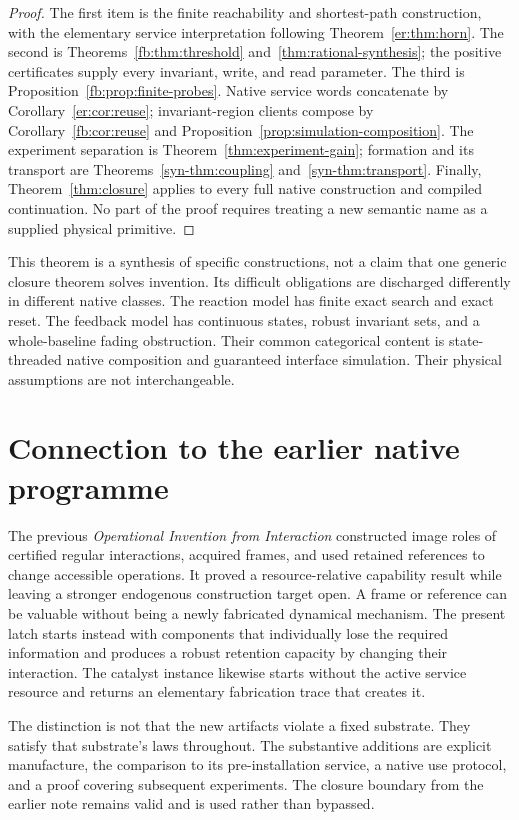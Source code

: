 \documentclass[11pt]{article}
\theoremstyle{definition}
\theoremstyle{remark}
\begin{document}
\begin{proof}
The first item is the finite reachability and shortest-path construction,
with the elementary service interpretation following
Theorem~\ref{er:thm:horn}. The second is
Theorems~\ref{fb:thm:threshold} and~\ref{thm:rational-synthesis}; the
positive certificates supply every invariant, write, and read parameter.
The third is Proposition~\ref{fb:prop:finite-probes}. Native service words
concatenate by Corollary~\ref{er:cor:reuse}; invariant-region clients
compose by Corollary~\ref{fb:cor:reuse} and
Proposition~\ref{prop:simulation-composition}. The experiment separation
is Theorem~\ref{thm:experiment-gain}; formation and its transport are
Theorems~\ref{syn-thm:coupling} and~\ref{syn-thm:transport}. Finally,
Theorem~\ref{thm:closure} applies to every full native construction and
compiled continuation. No part of the proof requires treating a new
semantic name as a supplied physical primitive.
\end{proof}

This theorem is a synthesis of specific constructions, not a claim that
one generic closure theorem solves invention. Its difficult obligations
are discharged differently in different native classes. The reaction
model has finite exact search and exact reset. The feedback model has
continuous states, robust invariant sets, and a whole-baseline fading
obstruction. Their common categorical content is state-threaded native
composition and guaranteed interface simulation. Their physical
assumptions are not interchangeable.

\section{Connection to the earlier native programme}\label{sec:project}
The previous \emph{Operational Invention from Interaction} constructed
image roles of certified regular interactions, acquired frames, and used
retained references to change accessible operations. It proved a
resource-relative capability result while leaving a stronger endogenous
construction target open. A frame or reference can be valuable without
being a newly fabricated dynamical mechanism. The present latch starts
instead with components that individually lose the required information
and produces a robust retention capacity by changing their interaction.
The catalyst instance likewise starts without the active service resource
and returns an elementary fabrication trace that creates it.

The distinction is not that the new artifacts violate a fixed substrate.
They satisfy that substrate's laws throughout. The substantive additions
are explicit manufacture, the comparison to its pre-installation service,
a native use protocol, and a proof covering subsequent experiments.
The closure boundary from the earlier note remains valid and is used
rather than bypassed.
\end{document}
